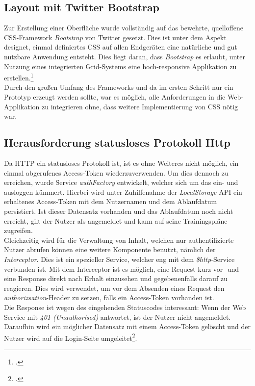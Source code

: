 \subsection{Layout mit Twitter Bootstrap}
\label{ssec:SPA-twitter-bootstrap}
Zur Erstellung einer Oberfläche wurde vollständig auf das bewehrte, quelloffene CSS-Framework \textit{Bootstrap} von Twitter gesetzt. Dies ist unter dem Aspekt designet, einmal definiertes CSS auf allen Endgeräten eine natürliche und gut nutzbare Anwendung entsteht. Dies liegt daran, dass \textit{Bootstrap} es erlaubt, unter Nutzung eines integrierten Grid-Systems eine hoch-responsive Applikation zu erstellen.\footcite{online:get-bootstrap}\\
Durch den großen Umfang des Frameworks und da im ersten Schritt nur ein Prototyp erzeugt werden sollte, war es möglich, alle Anforderungen in die Web-Applikation zu integrieren ohne, dass weitere Implementierung von CSS nötig war.

\subsection{Herausforderung statusloses Protokoll Http}
\label{ssec:statusloses-http}
Da HTTP ein statusloses Protokoll ist, ist es ohne Weiteres nicht möglich, ein einmal abgerufenes Access-Token wiederzuverwenden. Um dies dennoch zu erreichen, wurde Service \textit{authFactory} entwickelt, welcher sich um das ein- und ausloggen kümmert. Hierbei wird unter Zuhilfenahme der \textit{LocalStorage}-API ein erhaltenes Access-Token mit dem Nutzernamen und dem Ablaufdatum persistiert. Ist dieser Datensatz vorhanden und das Ablaufdatum noch nicht erreicht, gilt der Nutzer als angemeldet und kann auf seine Trainingspläne zugreifen. \\
Gleichzeitig wird für die Verwaltung von Inhalt, welchen nur authentifizierte Nutzer abrufen können eine weitere Komponente benutzt, nämlich der \textit{Interceptor}. Dies ist ein spezieller Service, welcher eng mit dem \textit{\$http}-Service verbunden ist. Mit dem Interceptor ist es möglich, eine Request kurz vor- und eine Response direkt nach Erhalt einzusehen und gegebenenfalls darauf zu reagieren. Dies wird verwendet, um vor dem Absenden eines Request den \textit{authorizsation}-Header zu setzen, falls ein Access-Token vorhanden ist. \\ Die Response ist wegen des eingehenden Statuscodes interessant: Wenn der Web Service mit \textit{401 (Unauthorised)} antwortet, ist der Nutzer nicht angemeldet. Daraufhin wird ein möglicher Datensatz mit einem Access-Token gelöscht und der Nutzer wird auf die Login-Seite umgeleitet\footcite{online:Created_SPA}. 

